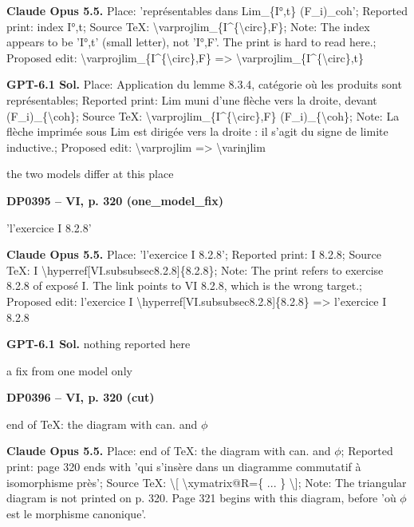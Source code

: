 \textbf{Claude Opus 5.5.} Place: 'représentables dans Lim\_\{I°,t\} (F\_i)\_coh'; Reported print: index I°,t; Source TeX: \textbackslash{}varprojlim\_\{I\textasciicircum{}\{\textbackslash{}circ\},F\}; Note: The index appears to be 'I°,t' (small letter), not 'I°,F'. The print is hard to read here.; Proposed edit: \textbackslash{}varprojlim\_\{I\textasciicircum{}\{\textbackslash{}circ\},F\} =\allowbreak > \textbackslash{}varprojlim\_\{I\textasciicircum{}\{\textbackslash{}circ\},t\}\par
\textbf{GPT-6.1 Sol.} Place: Application du lemme 8.3.4, catégorie où les produits sont représentables; Reported print: Lim muni d'une flèche vers la droite, devant (F\_i)\_\{\textbackslash{}coh\}; Source TeX: \textbackslash{}varprojlim\_\{I\textasciicircum{}\{\textbackslash{}circ\},F\} (F\_i)\_\{\textbackslash{}coh\}; Note: La flèche imprimée sous Lim est dirigée vers la droite : il s'agit du signe de limite inductive.; Proposed edit: \textbackslash{}varprojlim =\allowbreak > \textbackslash{}varinjlim\par
the two models differ at this place\par
\par\noindent\hypertarget{DP0395}{}\textbf{DP0395 -- VI, p. 320 (one\_model\_fix)}\par
'l'exercice I 8.2.8'\par
\textbf{Claude Opus 5.5.} Place: 'l'exercice I 8.2.8'; Reported print: I 8.2.8; Source TeX: I \textbackslash{}hyperref[VI.subsubsec8.2.8]\{8.2.8\}; Note: The print refers to exercise 8.2.8 of exposé I. The link points to VI 8.2.8, which is the wrong target.; Proposed edit: l'exercice I \textbackslash{}hyperref[VI.subsubsec8.2.8]\{8.2.8\} =\allowbreak > l'exercice I 8.2.8\par
\textbf{GPT-6.1 Sol.} nothing reported here\par
a fix from one model only\par
\par\noindent\hypertarget{DP0396}{}\textbf{DP0396 -- VI, p. 320 (cut)}\par
end of TeX: the diagram with can. and \ensuremath{\phi}\par
\textbf{Claude Opus 5.5.} Place: end of TeX: the diagram with can. and \ensuremath{\phi}; Reported print: page 320 ends with 'qui s'insère dans un diagramme commutatif à isomorphisme près'; Source TeX: \textbackslash{}[ \textbackslash{}xymatrix@R=\allowbreak 1.5cm\{ ... \} \textbackslash{}]; Note: The triangular diagram is not printed on p. 320. Page 321 begins with this diagram, before 'où \ensuremath{\phi} est le morphisme canonique'.\par
